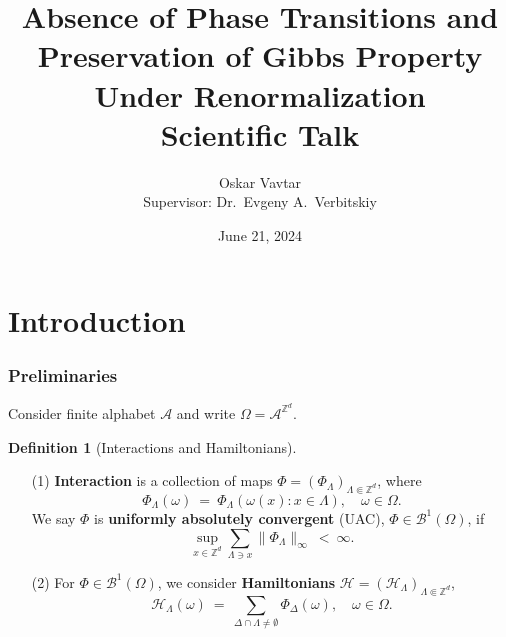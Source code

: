 \documentclass{beamer}
\newcommand{\A}{\mathcal{A}}
\newcommand{\BB}{\mathscr{B}}
\renewcommand{\H}{\mathcal{H}}
\newcommand{\Z}{\mathbb{Z}}
\newcommand{\1}{\mathbbm{1}}
\newcommand{\5}{\vspace{0.5cm}}
\newcommand{\3}{\vspace{0.3cm}}
\theoremstyle{definition}
\newtheorem{df}[thm]{Definition}
\begin{document}

\title[Scientific Talk]{Absence of Phase Transitions and Preservation of Gibbs Property Under Renormalization \\\vspace{0.4cm} \small{Scientific Talk}}
\author[Oskar Vavtar]{Oskar Vavtar \\\vspace{0.2cm} \small{Supervisor: Dr.~Evgeny A.~Verbitskiy}}
\date{June 21, 2024}

\begin{frame}
	\titlepage
\end{frame}


\section{Introduction}


\begin{frame}
\frametitle{Preliminaries}
Consider finite alphabet $\A$ and write $\Omega=\A^{\Z^d}$.
\begin{df}[Interactions and Hamiltonians]
\begin{itemize}
	\item[(1)] \textbf{Interaction} is a collection of maps $\Phi=(\Phi_\Lambda)_{\Lambda\Subset\Z^d}$, where
	$$\Phi_\Lambda(\omega) ~=~ \Phi_\Lambda(\omega(x):x\in\Lambda), \quad \omega\in\Omega.$$
	We say $\Phi$ is \textbf{uniformly absolutely convergent} (UAC), $\Phi\in\BB^1(\Omega)$, if
	$$\sup_{x\in\Z^d}\sum_{\Lambda\ni x}\|\Phi_\Lambda\|_\infty ~<~ \infty.$$
	\item[(2)] For $\Phi\in\BB^1(\Omega)$, we consider \textbf{Hamiltonians} $\H=(\H_{\Lambda})_{\Lambda\Subset\Z^d}$,
	$$\H_\Lambda(\omega) ~=~ \sum_{\Delta\cap\Lambda\neq\emptyset}\Phi_\Delta(\omega), \quad \omega\in\Omega.$$
\end{itemize}
\end{df}
\end{frame}
\end{document}
